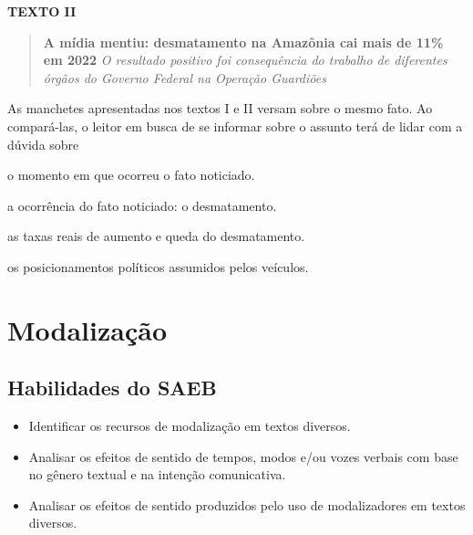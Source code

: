 
\textbf{TEXTO II}

\begin{quote}
\textbf{A mídia mentiu: desmatamento na Amazônia cai mais de 11\% em
2022} \emph{O resultado positivo foi consequência do trabalho de
diferentes órgãos do Governo Federal na Operação Guardiões}
\end{quote}


As manchetes apresentadas nos textos I e II versam sobre o mesmo fato.
Ao compará-las, o leitor em busca de se informar sobre o assunto terá de
lidar com a dúvida sobre

\begin{escolha}
\item o momento em que ocorreu o fato noticiado.

\item a ocorrência do fato noticiado: o desmatamento.

\item as taxas reais de aumento e queda do desmatamento.

\item os posicionamentos políticos assumidos pelos veículos.
\end{escolha}

\chapter{Modalização}

\section{Habilidades do SAEB} 

\begin{itemize}
\item Identificar os recursos de modalização
em textos diversos. 
\item Analisar os efeitos de sentido de tempos, modos
e/ou vozes verbais com base no gênero textual e na intenção
comunicativa.
\item Analisar os efeitos de sentido produzidos pelo uso de
modalizadores em textos diversos.
\end{itemize}

